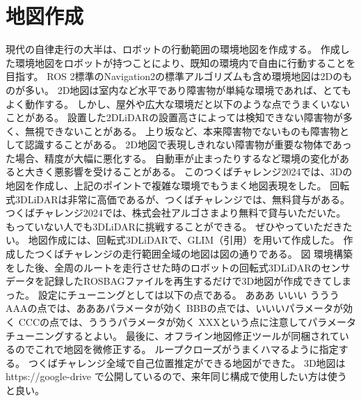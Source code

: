 \section{地図作成}
現代の自律走行の大半は、ロボットの行動範囲の環境地図を作成する。
作成した環境地図をロボットが持つことにより、既知の環境内で自由に行動することを目指す。
ROS 2標準のNavigation2の標準アルゴリズムも含め環境地図は2Dのものが多い。
2D地図は室内など水平であり障害物が単純な環境であれば、とてもよく動作する。
しかし、屋外や広大な環境だと以下のような点でうまくいないことがある。
設置した2DLiDARの設置高さによっては検知できない障害物が多く、無視できないことがある。
上り坂など、本来障害物でないものも障害物として認識することがある。
2D地図で表現しきれない障害物が重要な物体であった場合、精度が大幅に悪化する。
自動車が止まったりするなど環境の変化があると大きく悪影響を受けることがある。
このつくばチャレンジ2024では、3Dの地図を作成し、上記のポイントで複雑な環境でもうまく地図表現をした。
回転式3DLiDARは非常に高価であるが、つくばチャレンジでは、無料貸与がある。
つくばチャレンジ2024では、株式会社アルゴさまより無料で貸与いただいた。
もっていない人でも3DLiDARに挑戦することができる。
ぜひやっていただきたい。
地図作成には、回転式3DLiDARで、GLIM（引用）を用いて作成した。
作成したつくばチャレンジの走行範囲全域の地図は図の通りである。
図
環境構築をした後、全周のルートを走行させた時のロボットの回転式3DLiDARのセンサデータを記録したROSBAGファイルを再生するだけで3D地図が作成できてしまった。
設定にチューニングとしては以下の点である。
あああ
いいい
ううう
AAAの点では、あああパラメータが効く
BBBの点では、いいいパラメータが効く
CCCの点では、うううパラメータが効く
XXXという点に注意してパラメータチューニングするとよい。
最後に、オフライン地図修正ツールが同梱されているのでこれで地図を微修正する。
ループクローズがうまくハマるように指定する。
つくばチャレンジ全域で自己位置推定ができる地図ができた。
3D地図はhttps://google-drive で公開しているので、来年同じ構成で使用したい方は使うと良い。